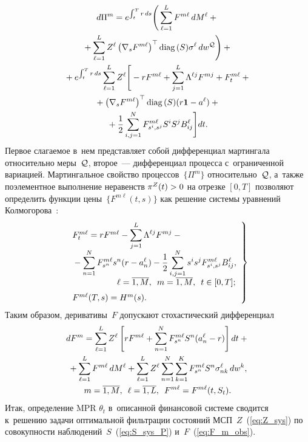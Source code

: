 \begin{multicols}{2}
\noindent
\begin{multline*}
d\Pi^m = e^{\int_t^T r\,ds}
\Bigg(
\sum\limits_{\ell=1}^L
F^{m\ell}\,dM^{\ell} +{}\\
{}+ \sum\limits_{\ell=1}^L Z^{\ell}
\left( \nabla_s F^{m\ell} \right)^{\top} \mathrm{diag}\,(S) \sigma^{\ell}\,dw^{{\mathcal Q}}
\Bigg) + {}\\
{}+
e^{\int\nolimits_t^T r\,ds}
\sum\limits_{\ell=1}^L Z^{\ell}
\Bigg[ -rF^{m\ell} + \sum\limits_{j=1}^L \Lambda^{\ell j}F^{mj} + F_t^{m\ell}+{}\\
{}+
\left(\nabla_s F^{m\ell} \right)^{\top} \mathrm{diag}\, (S)(r \mathbf{1} - a^{\ell})
+{}\\
{}+\displaystyle\frac{\displaystyle 1\mathstrut}{\displaystyle 2\mathstrut} \sum\limits_{i,j=1}^N F_{s^i,s^j}^{m\ell}S^iS^jB_{ij}^{\ell}
\Bigg]dt.
\end{multline*}
Первое слагаемое в~нем представляет собой дифференциал мартингала относительно меры~${\mathcal Q}$, второе~--- 
дифференциал процесса с~ограниченной вариацией. Мартингальное свойство процессов~$\{\Pi^m\}$ относительно~${\mathcal Q}$, 
а~также поэлементное выполнение неравенств $\pi^Z(t)\hm > 0$ на отрезке $[0,T]$ позволяют определить функции цены~$\{F^{m\ell}(t,s)\}$ 
как решение сис\-те\-мы уравнений Колмогорова~\cite{GS_3_75}:
\begin{equation}
\left.
\begin{array}{l}
F_t^{m\ell} = rF^{m\ell} - \displaystyle\sum\limits_{j=1}^L \Lambda^{\ell j}F^{mj} - {}\\[6pt]
{}-\displaystyle \sum\limits_{n=1}^N F_{s^n}^{m\ell}s^n(r - a_n^{\ell}) - 
 \fr{1}{2}  \sum\limits_{i,j=1}^N s^is^j F_{s^i,s^j}^{m\ell}B_{ij}^{\ell},\\[6pt]
 \hspace*{18.5mm}  \ell=\overline{1,M}, \enskip m=\overline{1,M}, \enskip
t \in [0,T];\\[6pt]
F^{m\ell}(T,s) = H^m(s).
\label{eq:F_m_eq}
\end{array}
\right\}
\end{equation}
Таким образом, деривативы~$F$ допускают стохастический дифференциал
\begin{multline}
dF^{m} =
 \sum\limits_{\ell=1}^L Z^{\ell}
 \left[
 r F^{m\ell} + \sum\limits_{n=1}^N F_{s^n}^{m\ell} S^n(a_n^{\ell} - r)
\right]dt + {}\\
{}+ \sum\limits_{\ell=1}^L F^{m\ell}\,dM^{\ell} +
 \sum\limits_{\ell=1}^L Z^{\ell} \sum\limits_{n=1}^N \sum\limits_{k=1}^K F_{s^n}^{m\ell} S^n \sigma_{nk}^{\ell}\,dw^k,\\
 m=\overline{1,M},\enskip \ell=\overline{1,L}, \enskip F^{m\ell}= F^{m\ell}(t,S_t).
\label{eq:F_m_obs}
\end{multline}
Итак, определение MPR $\theta_t$ в~описанной финансовой системе сводится к~решению задачи оптимальной фильтрации состояний МСП~$Z$~(\ref{eq:Z_sys}) 
по совокупности наблюдений~$S$~(\ref{eq:S_sys_P}) и~$F$~(\ref{eq:F_m_obs}).


\end{multicols}
